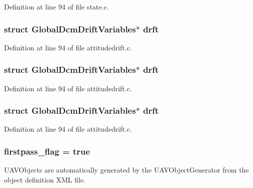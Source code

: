 Definition at line 94 of file state.\-c.

\hypertarget{group___attitude_ga89657be5e41cdb8b74d42e587333115a}{
\subsubsection[{drft}]{\setlength{\rightskip}{0pt plus 5cm}struct {\bf Global\-Dcm\-Drift\-Variables}$\ast$ drft}}\label{group___attitude_ga89657be5e41cdb8b74d42e587333115a}


Definition at line 94 of file attitudedrift.\-c.

\hypertarget{group___attitude_ga89657be5e41cdb8b74d42e587333115a}{
\subsubsection[{drft}]{\setlength{\rightskip}{0pt plus 5cm}struct {\bf Global\-Dcm\-Drift\-Variables}$\ast$ drft}}\label{group___attitude_ga89657be5e41cdb8b74d42e587333115a}


Definition at line 94 of file attitudedrift.\-c.

\hypertarget{group___attitude_ga89657be5e41cdb8b74d42e587333115a}{
\subsubsection[{drft}]{\setlength{\rightskip}{0pt plus 5cm}struct {\bf Global\-Dcm\-Drift\-Variables}$\ast$ drft}}\label{group___attitude_ga89657be5e41cdb8b74d42e587333115a}


Definition at line 94 of file attitudedrift.\-c.

\hypertarget{group___attitude_ga82c3e02e8def62d93a337dc338c4d6cd}{
\subsubsection[{firstpass\-\_\-flag}]{ firstpass\-\_\-flag = true}}\label{group___attitude_ga82c3e02e8def62d93a337dc338c4d6cd}
U\-A\-V\-Objects are automatically generated by the U\-A\-V\-Object\-Generator from the object definition X\-M\-L file.

